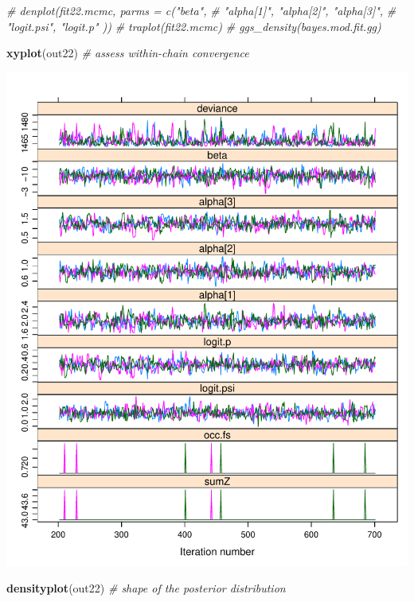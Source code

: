 \documentclass[]{book}
\newenvironment{Shaded}{\begin{snugshade}}{\end{snugshade}}
\newcommand{\KeywordTok}[1]{\textcolor[rgb]{0.13,0.29,0.53}{\textbf{{#1}}}}
\newcommand{\CommentTok}[1]{\textcolor[rgb]{0.56,0.35,0.01}{\textit{{#1}}}}
\newcommand{\NormalTok}[1]{{#1}}
\begin{document}
\begin{Shaded}
\begin{Highlighting}[]
\CommentTok{# denplot(fit22.mcmc, parms = c("beta", }
\CommentTok{#                               "alpha[1]", "alpha[2]", "alpha[3]", }
\CommentTok{#                               "logit.psi", "logit.p" ))}
\CommentTok{# traplot(fit22.mcmc)}
\CommentTok{# ggs_density(bayes.mod.fit.gg)}

\KeywordTok{xyplot}\NormalTok{(out22)        }\CommentTok{# assess within-chain convergence}
\end{Highlighting}
\end{Shaded}

\includegraphics{Simul-Machalilla-book_files/figure-latex/Bayesian-2.pdf}

\begin{Shaded}
\begin{Highlighting}[]
\KeywordTok{densityplot}\NormalTok{(out22)  }\CommentTok{# shape of the posterior distribution}
\end{Highlighting}
\end{Shaded}
\end{document}
